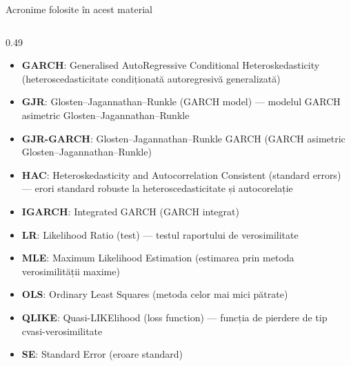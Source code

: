 \begin{frame}{Acronime folosite în acest material}
\begin{columns}[T]
\begin{column}{0.49\textwidth}
\begin{itemize}\setlength{\itemsep}{0pt}
    \item \textbf{GARCH}: Generalised AutoRegressive Conditional Heteroskedasticity (heteroscedasticitate condiționată autoregresivă generalizată)
    \item \textbf{GJR}: Glosten–Jagannathan–Runkle (GARCH model) — modelul GARCH asimetric Glosten–Jagannathan–Runkle
    \item \textbf{GJR-GARCH}: Glosten–Jagannathan–Runkle GARCH (GARCH asimetric Glosten–Jagannathan–Runkle)
    \item \textbf{HAC}: Heteroskedasticity and Autocorrelation Consistent (standard errors) — erori standard robuste la heteroscedasticitate și autocorelație
    \item \textbf{IGARCH}: Integrated GARCH (GARCH integrat)
    \item \textbf{LR}: Likelihood Ratio (test) — testul raportului de verosimilitate
    \item \textbf{MLE}: Maximum Likelihood Estimation (estimarea prin metoda verosimilității maxime)
    \item \textbf{OLS}: Ordinary Least Squares (metoda celor mai mici pătrate)
    \item \textbf{QLIKE}: Quasi-LIKElihood (loss function) — funcția de pierdere de tip cvasi-verosimilitate
    \item \textbf{SE}: Standard Error (eroare standard)
\end{itemize}
\end{column}
\end{columns}
\end{frame}

